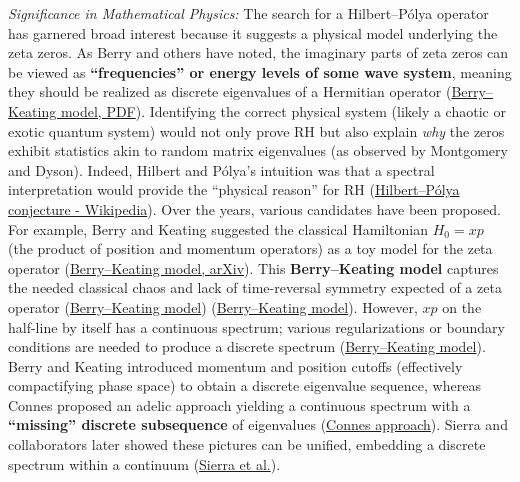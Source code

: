 \documentclass[12pt]{article}
\theoremstyle{plain}
\theoremstyle{definition}
\begin{document}
\textit{Significance in Mathematical Physics:} The search for a Hilbert--P\'olya operator has garnered broad interest because it suggests a physical model underlying the zeta zeros. As Berry and others have noted, the imaginary parts of zeta zeros can be viewed as \textbf{``frequencies'' or energy levels of some wave system}, meaning they should be realized as discrete eigenvalues of a Hermitian operator (\href{https://empslocal.ex.ac.uk/people/staff/mrwatkin/zeta/berry-keating1.pdf#:~:text=zeros%E2%80%9D%20are%20frequencies,Mathematically}{Berry--Keating model, PDF}). Identifying the correct physical system (likely a chaotic or exotic quantum system) would not only prove RH but also explain \emph{why} the zeros exhibit statistics akin to random matrix eigenvalues (as observed by Montgomery and Dyson). Indeed, Hilbert and P\'olya's intuition was that a spectral interpretation would provide the ``physical reason'' for RH (\href{https://en.wikipedia.org/wiki/Hilbert%E2%80%93P%C3%B3lya_conjecture#:~:text=In%20a%20letter%20to%20Andrew,parts%20t%20of%20the%20zeros}{Hilbert--P\'olya conjecture - Wikipedia}). Over the years, various candidates have been proposed. For example, Berry and Keating suggested the classical Hamiltonian $H_0 = xp$ (the product of position and momentum operators) as a toy model for the zeta operator (\href{https://arxiv.org/pdf/1205.6755#:~:text=should%20break%20time%20reversal%20invariance,regularizations%20leading%20to%20similar%20realizations}{Berry--Keating model, arXiv}). This \textbf{Berry--Keating model} captures the needed classical chaos and lack of time-reversal symmetry expected of a zeta operator (\href{https://arxiv.org/pdf/1205.6755#:~:text=towards%20construction%20of%20such%20an,However%2C%20it%20does}{Berry--Keating model}) (\href{https://arxiv.org/pdf/1205.6755#:~:text=should%20break%20time%20reversal%20invariance,regularizations%20leading%20to%20similar%20realizations}{Berry--Keating model}). However, $xp$ on the half-line by itself has a continuous spectrum; various regularizations or boundary conditions are needed to produce a discrete spectrum (\href{https://arxiv.org/pdf/1205.6755#:~:text=suggested%20that%20the%20operatorH0%3D%20xp,distinct%20interpretations%20of%20the%20model}{Berry--Keating model}). Berry and Keating introduced momentum and position cutoffs (effectively compactifying phase space) to obtain a discrete eigenvalue sequence, whereas Connes proposed an adelic approach yielding a continuous spectrum with a \textbf{``missing'' discrete subsequence} of eigenvalues (\href{https://arxiv.org/pdf/1205.6755#:~:text=main%20distinct%20regularizations,a%20discrete%20spectrum%20inside%20a}{Connes approach}). Sierra and collaborators later showed these pictures can be unified, embedding a discrete spectrum within a continuum (\href{https://arxiv.org/pdf/1205.6755#:~:text=main%20distinct%20regularizations,a%20discrete%20spectrum%20inside%20a}{Sierra et al.}).
\end{document}
